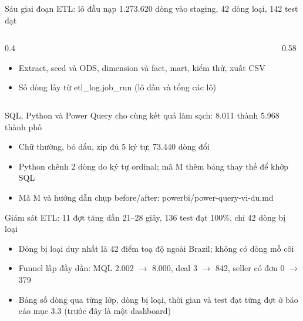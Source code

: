 \begin{frame}{Sáu giai đoạn ETL: lô đầu nạp 1.273.620 dòng vào staging, 42 dòng loại, 142 test đạt}
\begin{columns}[T]\begin{column}{0.4\textwidth}
\begin{itemize}
  \item Extract, seed và ODS, dimension và fact, mart, kiểm thử, xuất CSV
  \item Số dòng lấy từ etl\_log.job\_run (lô đầu và tổng các lô)
\end{itemize}
\end{column}\begin{column}{0.58\textwidth}
\begin{center}\end{center}
\end{column}\end{columns}

\end{frame}

\begin{frame}{SQL, Python và Power Query cho cùng kết quả làm sạch: 8.011 thành 5.968 thành phố}
\begin{itemize}
  \item Chữ thường, bỏ dấu, zip đủ 5 ký tự; 73.440 dòng đổi
  \item Python chênh 2 dòng do ký tự ordinal; mã M thêm bảng thay thế để khớp SQL
  \item Mã M và hướng dẫn chụp before/after: powerbi/power-query-vi-du.md
\end{itemize}

\end{frame}

\begin{frame}{Giám sát ETL: 11 đợt tăng dần 21--28 giây, 136 test đạt 100\%, chỉ 42 dòng bị loại}
\begin{itemize}
  \item Dòng bị loại duy nhất là 42 điểm toạ độ ngoài Brazil; không có dòng mồ côi
  \item Funnel lấp đầy dần: MQL 2.002 $\rightarrow$ 8.000, deal 3 $\rightarrow$ 842, seller có đơn 0 $\rightarrow$ 379
  \item Bảng số dòng qua từng lớp, dòng bị loại, thời gian và test đạt từng đợt ở báo cáo mục 3.3 (trước đây là một dashboard)
\end{itemize}

\end{frame}

